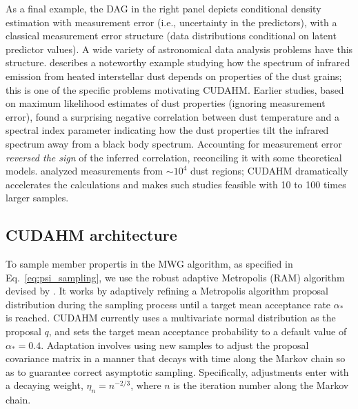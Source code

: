 As a final example, the DAG in the right panel depicts conditional density estimation with measurement error (i.e., uncertainty in the predictors), with a classical measurement error structure (data distributions conditional on latent predictor values).
A wide variety of astronomical data analysis problems have this structure.
\cite{K+12-DustSEDs} describes a noteworthy example studying how the spectrum of infrared emission from heated interstellar dust depends on properties of the dust grains; this is one of the specific problems motivating CUDAHM.
Earlier studies, based on maximum likelihood estimates of dust properties (ignoring measurement error), found a surprising negative correlation between dust temperature and a spectral index parameter indicating how the dust properties tilt the infrared spectrum away from a black body spectrum.
Accounting for measurement error \emph{reversed the sign} of the inferred correlation, reconciling it with some theoretical models.
\cite{K+12-DustSEDs} analyzed measurements from $\sim 10^4$ dust regions; CUDAHM dramatically accelerates the calculations and makes such studies feasible with 10 to 100 times larger samples.

\subsection{CUDAHM architecture}
\label{sec:arch}

To sample member propertis in the MWG algorithm, as specified in Eq.~\ref{eq:psi_sampling}, we use the robust adaptive Metropolis (RAM) algorithm devised by \cite{vihola2012robust}.
It works by adaptively refining a Metropolis algorithm proposal distribution during the sampling process until a target mean acceptance rate $\alpha_*$ is reached.
CUDAHM currently uses a multivariate normal distribution as the proposal $q$, and sets the target mean acceptance probability to a default value of $\alpha_{*}=0.4$.
Adaptation involves using new samples to adjust the proposal covariance matrix in a manner that decays with time along the Markov chain so as to guarantee correct asymptotic sampling.
Specifically, adjustments enter with a decaying weight, $\eta_{n}=n^{-2/3}$, where $n$ is the iteration number along the Markov chain.

